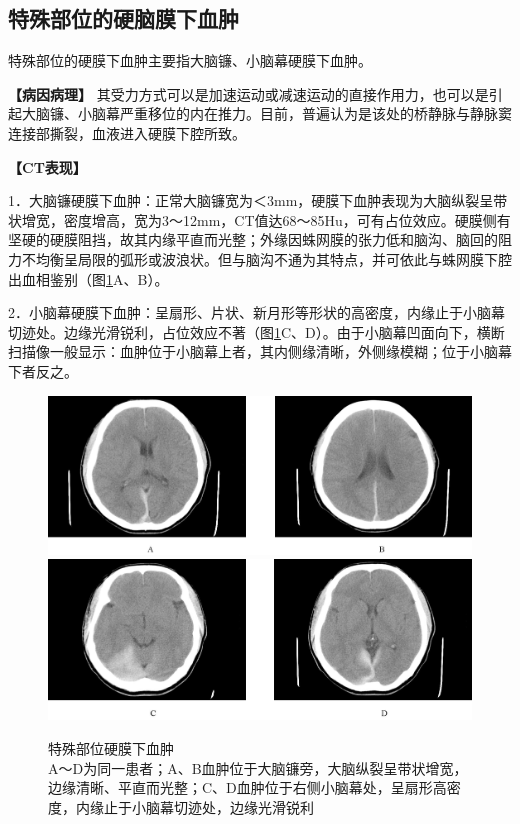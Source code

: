 \subsection{特殊部位的硬脑膜下血肿}

特殊部位的硬膜下血肿主要指大脑镰、小脑幕硬膜下血肿。

\textbf{【病因病理】}
其受力方式可以是加速运动或减速运动的直接作用力，也可以是引起大脑镰、小脑幕严重移位的内在推力。目前，普遍认为是该处的桥静脉与静脉窦连接部撕裂，血液进入硬膜下腔所致。

\textbf{【CT表现】}

1．大脑镰硬膜下血肿：正常大脑镰宽为＜3mm，硬膜下血肿表现为大脑纵裂呈带状增宽，密度增高，宽为3～12mm，CT值达68～85Hu，可有占位效应。硬膜侧有坚硬的硬膜阻挡，故其内缘平直而光整；外缘因蛛网膜的张力低和脑沟、脑回的阻力不均衡呈局限的弧形或波浪状。但与脑沟不通为其特点，并可依此与蛛网膜下腔出血相鉴别（图\ref{fig2-32}A、B）。

2．小脑幕硬膜下血肿：呈扇形、片状、新月形等形状的高密度，内缘止于小脑幕切迹处。边缘光滑锐利，占位效应不著（图\ref{fig2-32}C、D）。由于小脑幕凹面向下，横断扫描像一般显示：血肿位于小脑幕上者，其内侧缘清晰，外侧缘模糊；位于小脑幕下者反之。



\begin{figure}[!htbp]
 \centering
 \includegraphics[width=\textwidth,height=\textheight,keepaspectratio]{./images/Image00052.jpg}
 \includegraphics[width=\textwidth,height=\textheight,keepaspectratio]{./images/Image00053.jpg}
 \captionsetup{justification=centering}
 \caption{特殊部位硬膜下血肿\\{\small A～D为同一患者；A、B血肿位于大脑镰旁，大脑纵裂呈带状增宽，边缘清晰、平直而光整；C、D血肿位于右侧小脑幕处，呈扇形高密度，内缘止于小脑幕切迹处，边缘光滑锐利}}
 \label{fig2-32}
  \end{figure} 

